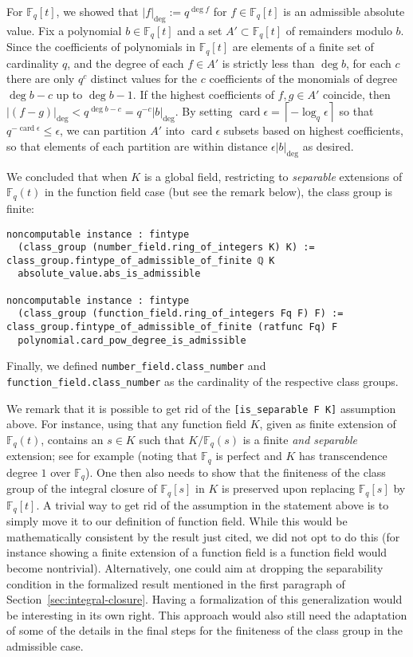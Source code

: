 \documentclass[sn-mathphys]{sn-jnl}%
\newcommand{\lean}[1]{\texttt{#1}\xspace}
\newcommand*{\Fq}[1][q]{\mathbb{F}_{#1}}
\DeclareMathOperator{\card}{card}
\begin{document}
For $\Fq[q][t]$, we showed that $\lvert f\rvert_{\deg}:=q^{\deg f}$ for $f \in \Fq[q][t]$ is an admissible absolute value.
Fix a polynomial $b \in \Fq[q][t]$ and a set $A' \subset \Fq[q][t]$ of remainders modulo $b$.
Since the coefficients of polynomials in $\Fq[q][t]$ are elements of a finite set of cardinality $q$,
and the degree of each $f \in A'$ is strictly less than $\deg b$,
for each $c$ there are only $q^c$ distinct values for the $c$ coefficients of the monomials of degree $\deg b - c$ up to $\deg b - 1$.
If the highest coefficients of $f, g \in A'$ coincide, then $\lvert (f-g) \rvert_{\deg} < q^{\deg b - c} = q^{-c} \lvert b \rvert_{\deg}$.
By setting $\card \epsilon = \left\lceil{-\log_{q} \epsilon}\right\rceil$ so that $q^{- \card \epsilon} \le \epsilon$,
we can partition $A'$ into $\card \epsilon$ subsets based on highest coefficients,
so that elements of each partition are within distance $\epsilon \lvert b \rvert_{\deg}$ as desired.

We concluded that when $K$ is a global field, restricting to \emph{separable} extensions of $\Fq[q](t)$ in the function field case (but see the remark below), the class group is finite:
\begin{lstlisting}
noncomputable instance : fintype
  (class_group (number_field.ring_of_integers K) K) :=
class_group.fintype_of_admissible_of_finite ℚ K
  absolute_value.abs_is_admissible

noncomputable instance : fintype
  (class_group (function_field.ring_of_integers Fq F) F) :=
class_group.fintype_of_admissible_of_finite (ratfunc Fq) F
  polynomial.card_pow_degree_is_admissible
\end{lstlisting}

Finally, we defined \lean{number\_field.class\_number} and \lean{function\_\-field.\linebreak[0]class\_\-number} as the cardinality of the respective class groups.

We remark that it is possible to get rid of the \lean{[is\_separable F K]} assumption above. 
For instance, using that any function field $K$, given as finite extension of $\Fq[q](t)$, contains an $s \in K$ such that $K/\Fq[q](s)$ is a finite \emph{and separable} extension; see for example \cite[Corollary 4.4 in Chapter VIII]{Lang} (noting that $\Fq$ is perfect and $K$ has transcendence degree $1$ over $\Fq$).
One then also needs to show that the finiteness of the class group of the integral closure of $\Fq[q][s]$ in $K$ is preserved upon replacing $\Fq[q][s]$ by $\Fq[q][t]$.
A trivial way to get rid of the assumption in the statement above is to simply move it to our definition of function field.
While this would be mathematically consistent by the result just cited, we did not opt to do this (for instance showing a finite extension of a function field is a function field
would become nontrivial).
Alternatively, one could aim at dropping the separability condition in the formalized result mentioned in the first paragraph of Section~\ref{sec:integral-closure}.
Having a formalization of this generalization would be interesting in its own right.
This approach would also still need the adaptation of some of the details in the final steps for the finiteness of the class group in the admissible case.
\end{document}
